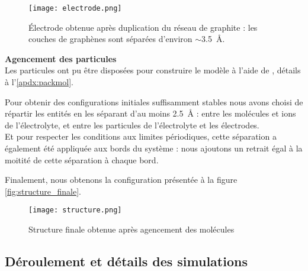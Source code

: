 \begin{figure}[h!]
    \centering
    \texttt{[image: electrode.png]}
    \caption{Électrode obtenue après duplication du réseau de graphite : {\footnotesize les couches de graphènes sont séparées d'environ $\sim$\qty{3.5}{\angstrom}.}}
    \label{fig:electrode}
\end{figure}

\textbf{Agencement des particules}\\
Les particules ont pu être disposées pour construire le modèle à l'aide de \packmol{}\cite{martinez_packmol_2009}, détails à l'\autoref{apdx:packmol}.

Pour obtenir des configurations initiales suffisamment stables nous avons choisi de répartir les entités en les séparant d'au moins \qty{2.5}{\angstrom} : entre les molécules et ions de l'électrolyte, et entre les particules de l'électrolyte et les électrodes.\\
Et pour respecter les conditions aux limites périodiques, cette séparation a également été appliquée aux bords du système : nous ajoutons un retrait égal à la moitité de cette séparation à chaque bord.

Finalement, nous obtenons la configuration présentée à la figure \autoref{fig:structure_finale}.

\begin{figure}[h!]
    \centering
    \texttt{[image: structure.png]}
    \caption{Structure finale obtenue après agencement des molécules}
    \label{fig:structure_finale}
\end{figure}

    \subsection{Déroulement et détails des simulations} \label{sec:deroulement_simulations}

